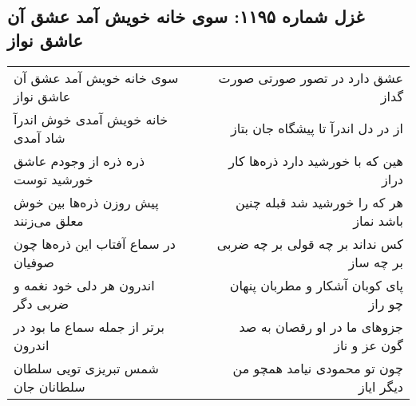\begin{center}
\section*{غزل شماره ۱۱۹۵: سوی خانه خویش آمد عشق آن عاشق نواز}
\label{sec:1195}
\begin{longtable}{l p{0.5cm} r}
سوی خانه خویش آمد عشق آن عاشق نواز
&&
عشق دارد در تصور صورتی صورت گداز
\\
خانه خویش آمدی خوش اندرآ شاد آمدی
&&
از در دل اندرآ تا پیشگاه جان بتاز
\\
ذره ذره از وجودم عاشق خورشید توست
&&
هین که با خورشید دارد ذره‌ها کار دراز
\\
پیش روزن ذره‌ها بین خوش معلق می‌زنند
&&
هر که را خورشید شد قبله چنین باشد نماز
\\
در سماع آفتاب این ذره‌ها چون صوفیان
&&
کس نداند بر چه قولی بر چه ضربی بر چه ساز
\\
اندرون هر دلی خود نغمه و ضربی دگر
&&
پای کوبان آشکار و مطربان پنهان چو راز
\\
برتر از جمله سماع ما بود در اندرون
&&
جزوهای ما در او رقصان به صد گون عز و ناز
\\
شمس تبریزی تویی سلطان سلطانان جان
&&
چون تو محمودی نیامد همچو من دیگر ایاز
\\
\end{longtable}
\end{center}
